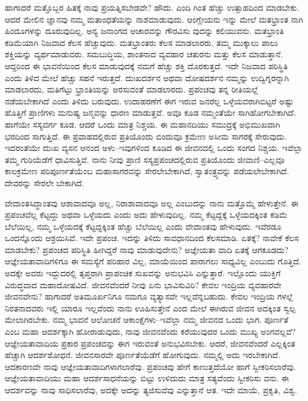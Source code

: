 ಹಾಗಾದರೆ ಮತ್ತೊಬ್ಬರ ಹಿತಕ್ಕೆ ನಾವು ಪ್ರಯತ್ನಿಸಬೇಡವೇ? ಹೌದು. ಎಂದಿ ಗಿಂತ ಹೆಚ್ಚು ಉತ್ಸಾಹದಿಂದ ಮಾಡಬೇಕು. ಆದರೆ ಮೇಲಿನ ಜ್ಞಾನವು ನಮ್ಮ ಮತಾಂಧತೆಯನ್ನು ನಾಶಮಾಡುವುದು. ಆಂಗ್ಲೇಯನು ಇನ್ನು ಮೇಲೆ ಮತಭ್ರಾಂತ ನಾಗಿ ಹಿಂದೂಗಳನ್ನು ದೂರುವುದಿಲ್ಲ. ಅನ್ಯ ಜನಾಂಗದ ಆಚಾರವನ್ನು ಗೌರವಿಸು ವುದನ್ನು ಕಲಿಯುವನು. ಮತಭ್ರಾಂತಿ ಕಡಿಮೆಯಾಗಿ ನಿಜವಾದ ಕೆಲಸ ಹೆಚ್ಚುವುದು. ಮತಭ್ರಾಂತರು ಕೆಲಸ ಮಾಡಲಾರರು. ತಮ್ಮ ಮುಕ್ಕಾಲು ಪಾಲು ಶಕ್ತಿಯನ್ನು ವ್ಯರ್ಥಮಾಡುವರು. ಸಮಬುದ್ಧಿಯ, ಶಾಂತನಾದ ವ್ಯವಹಾರ ಚತುರನು ಮತ್ತು ಕೆಲಸ ಮಾಡುತ್ತಾನೆ. ಆದ್ದರಿಂದ ಈ ಭಾವನೆಯಿಂದ ಕೆಲಸ ಮಾಡುವುದಕ್ಕೆ ನಮಗೆ ಹೆಚ್ಚು ಶಕ್ತಿ ದೊರಕುತ್ತದೆ. ಇದೇ ನಿಜವಾದ ಪರಿಸ್ಥಿತಿ ಎಂದು ತಿಳಿದ ಮೇಲೆ ಹೆಚ್ಚು ಸಹನೆ ಇರುತ್ತದೆ. ದುಃಖದರ್ಶನ ಅಥವಾ ದೋಷದರ್ಶನ ನಮ್ಮನ್ನು ಉದ್ವಿಗ್ನರನ್ನಾಗಿ ಮಾಡಲಾರದು, ಮತಿಗೆಟ್ಟು ಭ್ರಾಂತಿಯನ್ನು ಅರಸುವಂತೆ ಮಾಡಲಾರದು. ಪ್ರಪಂಚವು ತನ್ನ ರೀತಿಯಲ್ಲೆ ನಡೆಯಬೇಕಾಗಿದೆ ಎಂದು ತಿಳಿದು ಬರುವುದು. ಉದಾಹರಣೆಗೆ ಈಗ ಇರುವ ಜನರೆಲ್ಲ ಒಳ್ಳೆಯವರಾಗಿಬಿಟ್ಟರೆ ಅಷ್ಟು ಹೊತ್ತಿಗೆ ಪ್ರಾಣಿಗಳು ಮನುಷ್ಯ ಜನ್ಮವನ್ನು ಧಾರಣ ಮಾಡುತ್ತವೆ. ಅವೂ ಕೂಡ ನಮ್ಮಂತೆಯೇ ಸಾಗಿಹೋಗಬೇಕಾಗಿದೆ. ಹಾಗೆಯೇ ಸಸ್ಯವರ್ಗ ಕೂಡ. ಆದರೆ ಒಂದು ಮಾತ್ರ ನಿಶ್ಚಯ. ಈ ಮಹಾನದಿಯು ಸಮುದ್ರಕ್ಕೆ ಅಭಿಮುಖವಾಗಿ ಭರದಿಂದ ಸಾಗುತ್ತಿದೆ. ಈ ಪ್ರವಾಹದಲ್ಲಿರುವ ಪ್ರತಿಯೊಂದು ಬಿಂದುವೂ ಕ್ರಮೇಣ ಅಸೀಮ ಸಾಗರಕ್ಕೆ ಸೇರುವುದು. ಇದರಂತೆಯೇ ದುಃಖ ವ್ಯಸನ ಆನಂದ ಅಳು–ಇವುಗಳಿಂದ ಕೂಡಿದ ಈ ಜೀವನದಲ್ಲಿ ಒಂದು ಸಂಗದ ನಿಶ್ಚಯ. ಇವೆಲ್ಲಾ ತಮ್ಮ ಗುರಿಯೆಡೆಗೆ ಧಾವಿಸುತ್ತಿವೆ. ನಾನು ನೀವು ಪ್ರಾಣಿ ಸಸ್ಯಪ್ರಪಂಚದಲ್ಲಿರುವ ಪ್ರತಿಯೊಂದು ಜೀವಾಣಿ–ಎಲ್ಲವೂ ಕಾಲಕ್ರಮೇಣ ಪರಿಪೂರ್ಣತೆಯೆಂಬ ಮಹಾಸಾಗರವನ್ನು ಸೇರಲೇಬೇಕಾಗಿದೆ, ಸ್ವಾತಂತ್ರ್ಯವನ್ನು ಪಡೆಯಲೇಬೇಕಾಗಿದೆ. ದೇವರನ್ನು ಸೇರಲೇ ಬೇಕಾಗಿದೆ.

ವೇದಾಂತಸಿದ್ಧಾಂತವು ಆಶಾವಾದವೂ ಅಲ್ಲ, ನಿರಾಶಾವಾದವೂ ಅಲ್ಲ ಎಂಬುದನ್ನು ನಾನು ಮತ್ತೊಮ್ಮೆ ಹೇಳುತ್ತೇನೆ. ಈ ಪ್ರಪಂಚವೆಲ್ಲ ಕೆಟ್ಟದ್ದು ಅಥವಾ ಒಳ್ಳೆಯದು ಎಂದು ಅದು ಹೇಳುವುದಿಲ್ಲ. ನಮ್ಮ ಕೆಟ್ಟದ್ದಕ್ಕೆ ಒಳ್ಳೆಯದಕ್ಕಿಂತ ಕಡಿಮೆ ಬೆಲೆಯಿಲ್ಲ, ನಮ್ಮ ಒಳ್ಳೆಯದಕ್ಕೆ ಕೆಟ್ಟದ್ದಕ್ಕಿಂತ ಹೆಚ್ಚು ಬೆಲೆಯಿಲ್ಲ ಎಂದು ವೇದಾಂತವು ಹೇಳುವುದು. ಇವೆರಡೂ ಒಂದನ್ನೊಂದು ಆಶ್ರಯಿಸಿವೆ. ಇದೇ ಪ್ರಪಂಚ. ಇದನ್ನು ತಿಳಿದು ಸಾವಧಾನದಿಂದ ಕೆಲಸಮಾಡಿ. ಏತಕ್ಕೆ? ನಾವೇಕೆ ಕೆಲಸ ಮಾಡಬೇಕು? ಪ್ರಪಂಚದ ಪರಿಸ್ಥಿತಿ ಹೀಗಿದ್ದರೆ ನಾವು ಮಾಡುವುದೇನು? ಅಜ್ಞೇಯತಾ ವಾದಿ ಏತಕ್ಕೆ ಆಗಕೂಡದು? ಆಜ್ಞೇಯತಾವಾದಿಗಳಿಗೂ ಈ ಸಮಸ್ಯೆಗೆ ಪರಿಹಾರ ವಿಲ್ಲ, ಮಾಯೆಯಿಂದ ಪಾರಾಗಲು ಸಾಧ್ಯವಿಲ್ಲ ಎಂಬುದು ಗೊತ್ತಿದೆ. ಅದಕ್ಕೇ ಅವರು ಇದ್ದುದರಲ್ಲಿ ತೃಪ್ತರಾಗಿ ಪ್ರಾಪಂಚಿಕ ಸುಖವನ್ನು ಅನುಭವಿಸಿ ಎನ್ನುತ್ತಾರೆ. ಇಲ್ಲೊಂದು ಯುಕ್ತಿಗೆ ವಿರುದ್ಧವಾದ ಮಹಾದೋಷವಿದೆ. ಜೀವನವೆಂದರೆ ನೀವು ಏನು ಭಾವಿಸುವಿರಿ? ಕೇವಲ ಇಂದ್ರಿಯ ವ್ಯವಹಾರವೇ ಜೀವನವೇನು? ಹಾಗಾದರೆ ಅತಿಮೂರ್ಖನಿಗೂ ನಮಗೂ ವ್ಯತ್ಯಾಸವೇ ಇಲ್ಲವೆನ್ನಬಹುದು. ಕೇವಲ ಇಂದ್ರಿಯ ಗಳಲ್ಲೆ ನಿರತನಾದವರು ಇಲ್ಲಿ ಯಾರೂ ಇಲ್ಲವೆಂದು ನಾನು ಊಹಿಸುತ್ತೇನೆ ಎಂದ ಮೇಲೆ ಈಗಿರುವ ಜೀವನ ಅದಕ್ಕಿಂತ ಸ್ವಲ್ಪ ಮೇಲಾಗಿರಬೇಕು. ನಮ್ಮ ಭಾವನೆ ಆಲೋಚನೆ ಆಕಾಂಕ್ಷೆಗಳು–ಇವೆಲ್ಲಾ ನಮ್ಮ ಜೀವನದ ಒಂದು ಭಾಗ. ಪೂರ್ಣತೆ ಎಂಬ ಮಹಾ ಆದರ್ಶಕ್ಕಾಗಿ ಹೋರಾಡುವುದು, ನಾವು ಜೀವನವೆಂದು ಕರೆಯುವುದರ ಒಂದು ಮುಖ್ಯ ಅಂಗವಲ್ಲವೆ? ಆಜ್ಞೇಯತಾವಾದಿಯ ಪ್ರಕಾರ ಪ್ರಪಂಚವನ್ನು ಈಗ ಇರುವಂತೆ ಅನುಭವಿಸಬೇಕು. ಆದರೆ, ಜೀವನವೆಂದರೆ ಎಲ್ಲಕ್ಕಿಂತ ಹೆಚ್ಚಾಗಿ ಆದರ್ಶಶೋಧನೆ. ಜೀವನಸಾರವೇ ಪೂರ್ಣತೆಯೆಡೆಗೆ ಹೋಗುವುದು. ನಮ್ಮಲ್ಲಿ ಅದು ಇರಬೇಕಾಗಿದೆ. ಆದಕಾರಣವೇ ನಾವು ಆಜ್ಞೇಯತಾವಾದಿಗಳಾಗಲಾರೆವು. ಪ್ರಪಂಚವು ಹೇಗೆ ಕಾಣುತ್ತದೆಯೋ ಹಾಗೆ ಸ್ವೀಕರಿಸಲಾರೆವು. ಆಜ್ಞೇಯತಾವಾದಿಯು ಮಹಾ ಆದರ್ಶಸಾಧನೆಯನ್ನು ಬಿಟ್ಟು ಉಳಿದುದು ಮಾತ್ರ ಸತ್ಯವೆಂದು ಸ್ವೀಕರಿಸು ವನು. ಈ ಆದರ್ಶವನ್ನು ನಾವು ಸಾಧಿಸಲಾರೆವು, ಅದಕ್ಕೇ ಅದನ್ನು ತ್ಯಜಿಸುವೆವು ಎನ್ನುತ್ತಾನೆ ಆತ. ಇದೇ ಮಾಯೆ, ಪ್ರಕೃತಿ, ವಿಶ್ವ.

